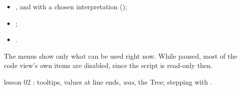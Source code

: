 \begin{itemize}
  \item {}, and  with a chosen interpretation ();
  \item {};
  \item {}.
\end{itemize}

The menus show only what can be used right now. While paused, most of the code view's own items are
disabled, since the script is read-only then.

\begin{lesson}{lesson 02}
: tooltips, values at line ends, \emph{was}, the Tree; stepping with .
\end{lesson}
